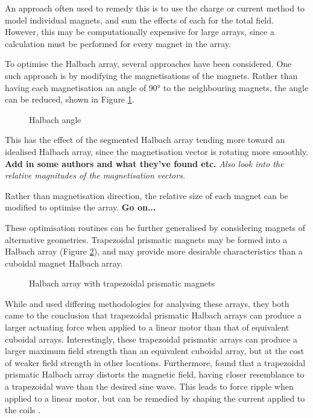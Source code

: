 An approach often used to remedy this is to use the charge or current method to model individual magnets, and sum the effects of each for the total field. However, this may be computationally expensive for large arrays, since a calculation must be performed for every magnet in the array.

To optimise the Halbach array, several approaches have been considered. One such approach is by modifying the magnetisations of the magnets. Rather than having each magnetisation an angle of \ang{90} to the neighbouring magnets, the angle can be reduced, shown in Figure \ref{fig:halbachAngle}.
\begin{figure}
    \centering
    \vspace{5cm}
    \caption{Halbach angle}
    \label{fig:halbachAngle}
\end{figure}
This has the effect of the segmented Halbach array tending more toward an idealised Halbach array, since the magnetisation vector is rotating more smoothly. \textbf{Add in some authors and what they've found etc.} \textit{Also look into the relative magnitudes of the magnetisation vectors.}

Rather than magnetisation direction, the relative size of each magnet can be modified to optimise the array. \textbf{Go on...}

These optimisation routines can be further generalised by considering magnets of alternative geometries. Trapezoidal prismatic magnets may be formed into a Halbach array (Figure \ref{fig:trapezoidalPrismaticHalbach}), and may provide more desirable characteristics than a cuboidal magnet Halbach array.
\begin{figure}
    \centering
    \vspace{5cm}
    \caption{Halbach array with trapezoidal prismatic magnets}
    \label{fig:trapezoidalPrismaticHalbach}
\end{figure}
While \textcite{Lee2004} and \textcite{Meessen2008} used differing methodologies for analysing these arrays, they both came to the conclusion that trapezoidal prismatic Halbach arrays can produce a larger actuating force when applied to a linear motor than that of equivalent cuboidal arrays. Interestingly, these trapezoidal prismatic arrays can produce a larger maximum field strength than an equivalent cuboidal array, but at the cost of weaker field strength in other locations. Furthermore, \textcite{Lee2006} found that a trapezoidal prismatic Halbach array distorts the magnetic field, having closer resemblance to a trapezoidal wave than the desired sine wave. This leads to force ripple when applied to a linear motor, but can be remedied by shaping the current applied to the coils \cite{Lee2006}.

